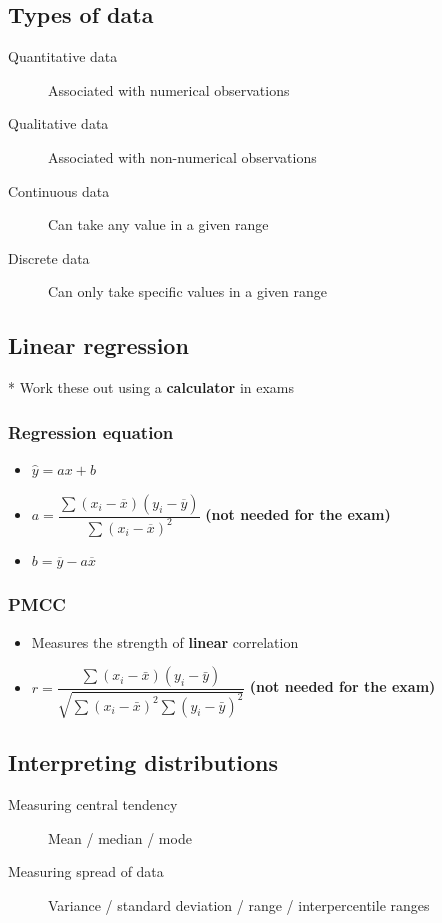 \documentclass[A4paper, 11pt]{article}
\begin{document}
	\subsection{Types of data}
	\begin{description}
		\item[Quantitative data] Associated with numerical observations
		\item[Qualitative data] Associated with non-numerical observations
		\item[Continuous data] Can take any value in a given range
		\item[Discrete data] Can only take specific values in a given range
	\end{description}
	
	\subsection{Linear regression}
	* Work these out using a \textbf{calculator} in exams
	\subsubsection{Regression equation}
	\begin{itemize}
		\item $\hat{y}=ax+b$
		\item $a=\dfrac{\sum (x_i-\overline{x}) (y_i-\overline{y})}{\sum (x_i-\overline{x})^2}$ \textbf{(not needed for the exam)}
		\item $b=\overline{y}-a\overline{x}$
	\end{itemize}
	
	\subsubsection{PMCC}
	\begin{itemize}
		\item Measures the strength of \textbf{linear} correlation
		\item $r =\dfrac{\sum\left(x_{i}-\bar{x}\right)\left(y_{i}-\bar{y}\right)}{\sqrt{\sum\left(x_{i}-\bar{x}\right)^{2} \sum\left(y_{i}-\bar{y}\right)^{2}}}$ \textbf{(not needed for the exam)}
	\end{itemize}
	
	\subsection{Interpreting distributions}
	\begin{description}
		\item[Measuring central tendency] Mean / median / mode
		\item[Measuring spread of data] Variance / standard deviation / range / interpercentile ranges
	\end{description}
	
\end{document}
